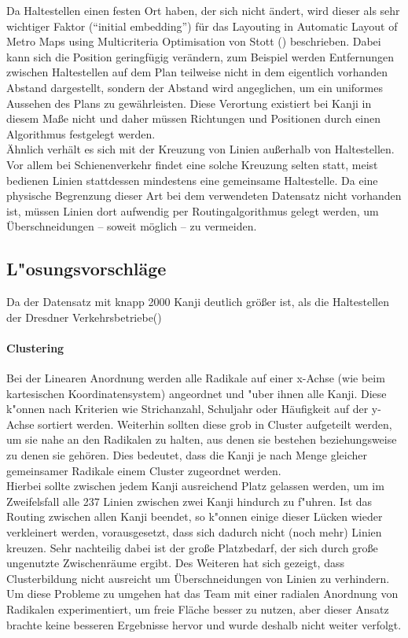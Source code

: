 Da Haltestellen einen festen Ort haben, der sich nicht ändert, wird dieser als sehr wichtiger Faktor ("`initial embedding"') für das Layouting in Automatic Layout of Metro Maps using Multicriteria Optimisation von Stott (\cite{automaticlayoutmetro08}) beschrieben. Dabei kann sich die Position geringfügig verändern, zum Beispiel werden Entfernungen zwischen Haltestellen auf dem Plan teilweise nicht in dem eigentlich vorhanden Abstand dargestellt, sondern der Abstand wird angeglichen, um ein uniformes Aussehen des Plans zu gewährleisten. Diese Verortung existiert bei Kanji in diesem Maße nicht und daher müssen Richtungen und Positionen durch einen Algorithmus festgelegt werden. \\
Ähnlich verhält es sich mit der Kreuzung von Linien außerhalb von Haltestellen. Vor allem bei Schienenverkehr findet eine solche Kreuzung selten statt, meist bedienen Linien stattdessen mindestens eine gemeinsame Haltestelle. Da eine physische Begrenzung dieser Art bei dem verwendeten Datensatz nicht vorhanden ist, müssen Linien dort aufwendig per Routingalgorithmus gelegt werden, um Überschneidungen – soweit möglich – zu vermeiden.

\subsection{L"osungsvorschläge}
Da der Datensatz mit knapp 2000 Kanji deutlich größer ist, als die Haltestellen der Dresdner Verkehrsbetriebe(\cite{dvbag})
\paragraph{Clustering}
Bei der Linearen Anordnung werden alle Radikale auf einer x-Achse (wie beim kartesischen Koordinatensystem) angeordnet und "uber ihnen alle Kanji. Diese k"onnen nach Kriterien wie Strichanzahl, Schuljahr oder Häufigkeit auf der y-Achse sortiert werden. Weiterhin sollten diese grob in Cluster aufgeteilt werden, um sie nahe an den Radikalen zu halten, aus denen sie bestehen beziehungsweise zu denen sie gehören. Dies bedeutet, dass die Kanji je nach Menge gleicher gemeinsamer Radikale einem Cluster zugeordnet werden. \\
Hierbei sollte zwischen jedem Kanji ausreichend Platz gelassen werden, um im Zweifelsfall alle 237 Linien zwischen zwei Kanji hindurch zu f"uhren. Ist das Routing zwischen allen Kanji beendet, so k"onnen einige dieser Lücken wieder verkleinert werden, vorausgesetzt, dass sich dadurch nicht (noch mehr) Linien kreuzen. 
Sehr nachteilig dabei ist der große Platzbedarf, der sich durch große ungenutzte Zwischenräume ergibt. Des Weiteren hat sich gezeigt, dass Clusterbildung nicht ausreicht um Überschneidungen von Linien zu verhindern. \\
Um diese Probleme zu umgehen hat das Team mit einer radialen Anordnung von Radikalen experimentiert, um freie Fläche besser zu nutzen, aber dieser Ansatz brachte keine besseren Ergebnisse hervor und wurde deshalb nicht weiter verfolgt.
